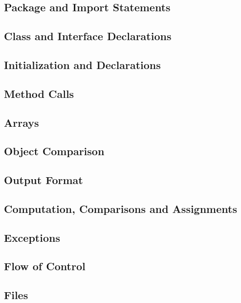 \subsection{Package and Import Statements}
\blindtext

\subsection{Class and Interface Declarations}
\blindtext

\subsection{Initialization and Declarations}
\blindtext

\subsection{Method Calls}
\blindtext

\subsection{Arrays}
\blindtext

\subsection{Object Comparison}
\blindtext

\subsection{Output Format}
\blindtext

\subsection{Computation, Comparisons and Assignments}
\blindtext

\subsection{Exceptions}
\blindtext

\subsection{Flow of Control}
\blindtext

\subsection{Files}
\blindtext
